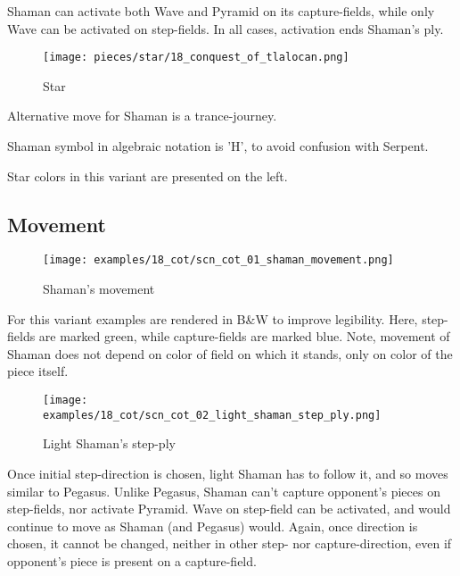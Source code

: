 Shaman can activate both Wave and Pyramid on its capture-fields, while only
Wave can be activated on step-fields. In all cases, activation ends Shaman's
ply.

\noindent
\begin{wrapfigure}{l}{0.4\textwidth}
\centering
\texttt{[image: pieces/star/18\_conquest\_of\_tlalocan.png]}
\caption{Star}
\label{fig:star/18_conquest_of_tlalocan}
\end{wrapfigure}
Alternative move for Shaman is a trance-journey.

Shaman symbol in algebraic notation is 'H', to avoid confusion with Serpent.

Star colors in this variant are presented on the left.

\clearpage %

\subsection*{Movement}
\label{sec:Conquest of Tlalocan/Shaman/Movement}

\vspace*{-1.2\baselineskip}
\noindent
\begin{figure}[!h]
\texttt{[image: examples/18\_cot/scn\_cot\_01\_shaman\_movement.png]}
\caption{Shaman's movement}
\label{fig:scn_cot_01_shaman_movement}
\end{figure}

For this variant examples are rendered in B\&W to improve legibility.
Here, step-fields are marked green, while capture-fields are marked blue.
Note, movement of Shaman does not depend on color of field on which it
stands, only on color of the piece itself.

\clearpage %

\noindent
\begin{figure}[!h]
\texttt{[image: examples/18\_cot/scn\_cot\_02\_light\_shaman\_step\_ply.png]}
\caption{Light Shaman's step-ply}
\label{fig:scn_cot_02_light_shaman_step_ply}
\end{figure}

Once initial step-direction is chosen, light Shaman has to follow it,
and so moves similar to Pegasus. Unlike Pegasus, Shaman can't capture
opponent's pieces on step-fields, nor activate Pyramid. Wave on step-field
can be activated, and would continue to move as Shaman (and Pegasus)
would. Again, once direction is chosen, it cannot be changed, neither
in other step- nor capture-direction, even if opponent's piece is present
on a capture-field.

